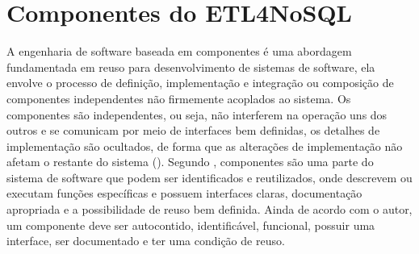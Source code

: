 







\section{Componentes do ETL4NoSQL}

A engenharia de software baseada em componentes é uma abordagem fundamentada em reuso para desenvolvimento de sistemas de software, ela envolve o processo de definição, implementação e integração ou composição de componentes independentes não firmemente acoplados ao sistema. Os componentes são independentes, ou seja, não interferem na operação uns dos outros e se comunicam por meio de interfaces bem definidas, os detalhes de implementação são ocultados, de forma que as alterações de implementação não afetam o restante do sistema (\cite{sommerville:2013}). Segundo \cite{sametinger:1997}, componentes são uma parte do sistema de software que podem ser identificados e reutilizados, onde descrevem ou executam funções específicas e possuem interfaces claras, documentação apropriada e a possibilidade de reuso bem definida. Ainda de acordo com o autor, um componente deve ser autocontido, identificável, funcional, possuir uma interface, ser documentado e ter uma condição de reuso. 

